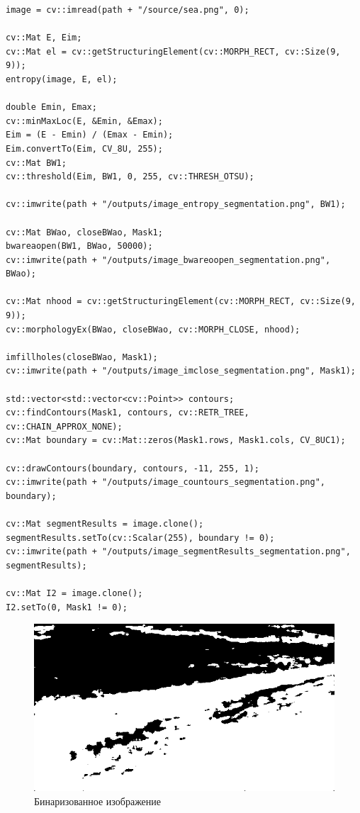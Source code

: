 \begin{lstlisting}[style=cpp_white, caption={Текстурная сегментация}]
image = cv::imread(path + "/source/sea.png", 0);

cv::Mat E, Eim;
cv::Mat el = cv::getStructuringElement(cv::MORPH_RECT, cv::Size(9, 9));
entropy(image, E, el);

double Emin, Emax;
cv::minMaxLoc(E, &Emin, &Emax);
Eim = (E - Emin) / (Emax - Emin);
Eim.convertTo(Eim, CV_8U, 255);
cv::Mat BW1;
cv::threshold(Eim, BW1, 0, 255, cv::THRESH_OTSU);

cv::imwrite(path + "/outputs/image_entropy_segmentation.png", BW1);

cv::Mat BWao, closeBWao, Mask1;
bwareaopen(BW1, BWao, 50000);
cv::imwrite(path + "/outputs/image_bwareoopen_segmentation.png", BWao);

cv::Mat nhood = cv::getStructuringElement(cv::MORPH_RECT, cv::Size(9, 9));
cv::morphologyEx(BWao, closeBWao, cv::MORPH_CLOSE, nhood);

imfillholes(closeBWao, Mask1);
cv::imwrite(path + "/outputs/image_imclose_segmentation.png", Mask1);

std::vector<std::vector<cv::Point>> contours;
cv::findContours(Mask1, contours, cv::RETR_TREE, cv::CHAIN_APPROX_NONE);
cv::Mat boundary = cv::Mat::zeros(Mask1.rows, Mask1.cols, CV_8UC1);

cv::drawContours(boundary, contours, -11, 255, 1);
cv::imwrite(path + "/outputs/image_countours_segmentation.png", boundary);

cv::Mat segmentResults = image.clone();
segmentResults.setTo(cv::Scalar(255), boundary != 0);
cv::imwrite(path + "/outputs/image_segmentResults_segmentation.png", segmentResults);

cv::Mat I2 = image.clone();
I2.setTo(0, Mask1 != 0);
\end{lstlisting}

\begin{figure}[H]
    \includegraphics[width=\textwidth]{../outputs/image_entropy_segmentation.png}
    \caption{Бинаризованное изображение}
    \label{fig:р}
\end{figure}

